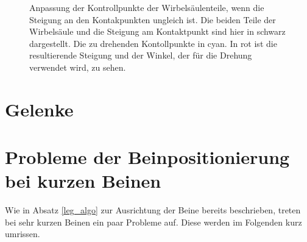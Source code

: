 \begin{figure}
 \qquad
 \caption{Anpassung der Kontrollpunkte der Wirbelsäulenteile, wenn die Steigung an den Kontakpunkten ungleich ist. Die beiden Teile der Wirbelsäule und die Steigung am Kontaktpunkt sind hier in schwarz dargestellt. Die zu drehenden Kontollpunkte in cyan. In rot ist die resultierende Steigung und der Winkel, der für die Drehung verwendet wird, zu sehen.}
 \label{smooth_spine}
\end{figure}


\section{Gelenke}


\section{Probleme der Beinpositionierung bei kurzen Beinen}
\label{leg_positioning_short_legs}

Wie in Absatz \ref{leg_algo} zur Ausrichtung der Beine bereits beschrieben, treten bei sehr kurzen Beinen ein paar Probleme auf. Diese werden im Folgenden kurz umrissen.

